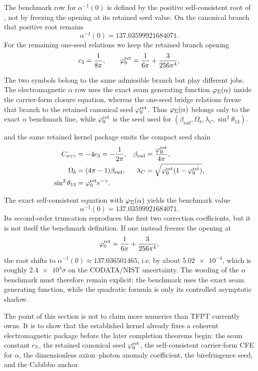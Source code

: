 The benchmark row for $\alpha^{-1}(0)$ is defined by the positive self-consistent root of , not by freezing the opening at its retained seed value. On the canonical branch that positive root remains
\[
\alpha^{-1}(0)=\num{137.03599921684071}.
\]
For the remaining one-seed relations we keep the retained branch opening
\begin{equation}
\label{eq:hard-kernel-values}
c_3=\frac{1}{8\pi},
\qquad
\varphi_0^{\mathrm{ret}}=\frac{1}{6\pi}+\frac{3}{256\pi^4},
\end{equation}
\begin{remark}
The two symbols belong to the same admissible branch but play different jobs. The electromagnetic $\alpha$ row uses the exact seam generating function $\varphi_{\Sigma}(\alpha)$ inside the carrier-form closure equation, whereas the one-seed bridge relations freeze that branch to the retained canonical seed $\varphi_0^{\mathrm{ret}}$. Thus $\varphi_{\Sigma}(\alpha)$ belongs only to the exact $\alpha$ benchmark line, while $\varphi_0^{\mathrm{ret}}$ is the seed used for $(\beta_{\mathrm{rad}},\Omega_b,\lambda_C,\sin^2\theta_{13})$.
\end{remark}
and the same retained kernel package emits the compact seed chain
\begin{equation}
\label{eq:kernel-benchmark-formulas}
\begin{aligned}
C_{a\gamma\gamma}&=-4c_3=-\frac{1}{2\pi},
&
\beta_{\mathrm{rad}}&=\frac{\varphi_0^{\mathrm{ret}}}{4\pi},
\\
\Omega_b&=(4\pi-1)\beta_{\mathrm{rad}},
&
\lambda_C&=\sqrt{\varphi_0^{\mathrm{ret}}(1-\varphi_0^{\mathrm{ret}})},
\\
\sin^2\theta_{13}&=\varphi_0^{\mathrm{ret}} e^{-\gamma}.
\end{aligned}
\end{equation}
\begin{remark}
The exact self-consistent equation with $\varphi_{\Sigma}(\alpha)$ yields the benchmark value
\[
\alpha^{-1}(0)=\num{137.03599921684071}.
\]
Its second-order truncation reproduces the first two correction coefficients, but it is not itself the benchmark definition. If one instead freezes the opening at
\[
\varphi_0^{\mathrm{ret}}=\frac{1}{6\pi}+\frac{3}{256\pi^4},
\]
the root shifts to $\alpha^{-1}(0)\approx \num{137.036501465}$, i.e. by about $\num{5.02e-4}$, which is roughly $\num{2.4e4}\sigma$ on the CODATA/NIST uncertainty. The wording of the $\alpha$ benchmark must therefore remain explicit: the benchmark uses the exact seam generating function, while the quadratic formula is only its controlled asymptotic shadow.
\end{remark}
\begin{tcolorbox}[colback=tfptblue!3, colframe=tfptblue, breakable,
    title={Kernel-output package}, colbacktitle=tfptblue]
The point of this section is not to claim more numerics than TFPT currently owns. It is to show that the established kernel already fixes a coherent electromagnetic package before the later completion theorems begin: the seam constant $c_3$, the retained canonical seed $\varphi_0^{\mathrm{ret}}$, the self-consistent carrier-form CFE for $\alpha$, the dimensionless axion--photon anomaly coefficient, the birefringence seed, and the Cabibbo anchor.
\end{tcolorbox}

